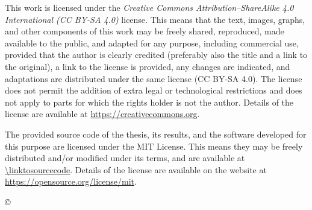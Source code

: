 \thispagestyle{empty}
\vspace*{\fill}
{\noindent\footnotesize


\vspace*{5cm}
{\small \noindent
This work is licensed under the \textit{Creative Commons Attribution–ShareAlike 4.0 International (CC BY-SA 4.0)} license.
This means that the text, images, graphs, and other components of this work may be freely shared, reproduced, made available to the public, and adapted for any purpose, including commercial use, provided that the author is clearly credited (preferably also the title and a link to the original), a link to the license is provided, any changes are indicated, and adaptations are distributed under the same license (CC BY-SA 4.0). The license does not permit the addition of extra legal or technological restrictions and does not apply to parts for which the rights holder is not the author.
Details of the license are available at \url{https://creativecommons.org}.

\begin{center}%
\hspace*{1ex}\hspace*{1ex}%
\end{center}
}

\ifCODEPUBLISHED
\vspace*{1.5cm}
{\small \noindent
The provided source code of the thesis, its results, and the software developed
for this purpose are licensed under the MIT License. This means they may be
freely distributed and/or modified under its terms, and are available at
\url{\linktosourcecode}. Details of the license are available on the website at 
\url{https://opensource.org/license/mit}.
}
\fi
   
}
\begin{center}
{\footnotesize{\sc \copyright \myyear\ \tauthor}}
\end{center} 